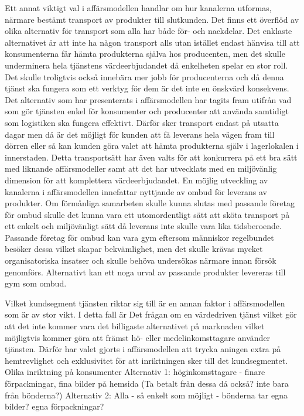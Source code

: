 \documentclass[10pt,a4paper,oneside]{article}
\begin{document}
Ett annat viktigt val i affärsmodellen handlar om hur kanalerna utformas, närmare bestämt transport av produkter till slutkunden. Det finns ett överflöd av olika alternativ för transport som alla har både för- och nackdelar. Det enklaste alternativet är att inte ha någon transport alls utan istället endast hänvisa till att konsumenterna får hämta produkterna själva hos producenten, men det skulle underminera hela tjänstens värdeerbjudandet då enkelheten spelar en stor roll. Det skulle troligtvis också innebära mer jobb för producenterna och då denna tjänst ska fungera som ett verktyg för dem är det inte en önskvärd konsekvens. Det alternativ som har presenterats i affärsmodellen har tagits fram utifrån vad som gör tjänsten enkel för konsumenter och producenter att använda samtidigt som logistiken ska fungera effektivt. Därför sker transport endast på utsatta dagar men då är det möjligt för kunden att få leverans hela vägen fram till dörren eller så kan kunden göra valet att hämta produkterna själv i lagerlokalen i innerstaden. Detta transportsätt har även valts för att konkurrera på ett bra sätt med liknande affärsmodeller samt att det har utvecklats med en miljövänlig dimension för att komplettera värdeerbjudandet. En möjlig utveckling av kanalerna i affärsmodellen innefattar nyttjande av ombud för leverans av produkter. Om förmånliga samarbeten skulle kunna slutas med passande företag för ombud skulle det kunna vara ett utomordentligt sätt att sköta transport på ett enkelt och miljövänligt sätt då leverans inte skulle vara lika tidsberoende. Passande företag för ombud kan vara gym eftersom människor regelbundet besöker dessa vilket skapar bekvämlighet, men det skulle krävas mycket organisatoriska insatser och skulle behöva undersökas närmare innan försök genomförs. Alternativt kan ett noga urval av passande produkter levereras till gym som ombud.

Vilket kundsegment tjänsten riktar sig till är en annan faktor i affärsmodellen som är av stor vikt. I detta fall är Det frågan om en värdedriven tjänst vilket gör att det inte kommer vara det billigaste alternativet på marknaden vilket möjligtvis kommer göra att främst hö- eller medelinkomsttagare använder tjänsten. Därför har valet gjorts i affärsmodellen att trycka aningen extra på hemtrevlighet och exklusivitet för att inriktningen sker till det kundsegmentet.  
Olika inriktning på konsumenter 
Alternativ 1: höginkomsttagare - finare förpackningar, fina bilder på hemsida (Ta betalt från dessa då också? inte bara från bönderna?)
Alternativ 2: Alla - så enkelt som möjligt - bönderna tar egna bilder? egna förpackningar? 
\end{document}
